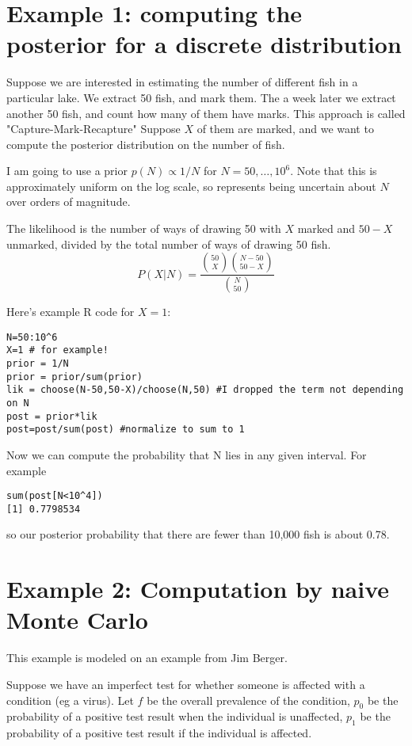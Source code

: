 \documentclass[11pt]{article}
\begin{document}
\normalsize


\section{Example 1: computing the posterior for a discrete distribution}

Suppose we are interested in estimating the number of different fish in a particular lake. We extract 50 fish, and mark them. The a week later
we extract another 50 fish, and count how many of them have marks.  
This approach is called "Capture-Mark-Recapture"
Suppose $X$ of them are marked, and we want to compute the posterior distribution on the number of fish.	

I am going to use a prior $p(N) \propto 1/N$ for $N=50,\dots,10^6$. Note that this is approximately
uniform on the log scale, so represents being uncertain about $N$ over orders of magnitude.

The likelihood is the number of ways of drawing 50 with $X$ marked and $50-X$ unmarked, divided by the total number of ways of drawing 50 fish.
\begin{equation}
P(X|N) = \frac{{50 \choose X} {N-50 \choose 50-X} } {{N \choose 50}}
\end{equation}

Here's example R code for $X=1$:
\begin{verbatim}
N=50:10^6
X=1 # for example!
prior = 1/N
prior = prior/sum(prior)
lik = choose(N-50,50-X)/choose(N,50) #I dropped the term not depending on N
post = prior*lik
post=post/sum(post) #normalize to sum to 1
\end{verbatim}

Now we can compute the probability that N lies in any given interval. For example
\begin{verbatim}
sum(post[N<10^4])
[1] 0.7798534
\end{verbatim}
so our posterior probability that there are fewer than 10,000 fish is about 0.78.


\section{Example 2: Computation by naive Monte Carlo}

This example is modeled on an example from Jim Berger.

Suppose we have an imperfect test for whether someone is affected
with a condition (eg a virus). 
Let $f$ be the overall prevalence of the condition,
$p_0$ be the probability of a positive test result when the individual is unaffected, $p_1$ be the probability of a positive test result if the individual is affected.
\end{document}
